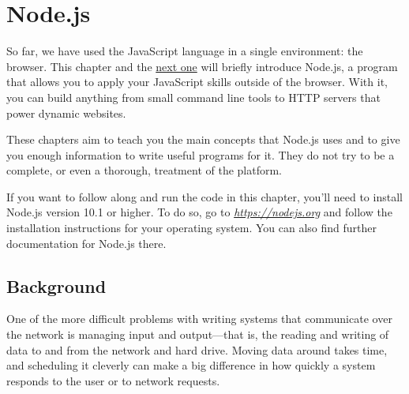 \chapter{Node.js}\label{node}


So far, we have used the JavaScript language in a single environment: the browser. This chapter and the \hyperref[skillsharing]{next one} will briefly introduce Node.js, a program that allows you to apply your JavaScript skills outside of the browser. With it, you can build anything from small command line tools to HTTP servers that power dynamic websites.

These chapters aim to teach you the main concepts that Node.js uses and to give you enough information to write useful programs for it. They do not try to be a complete, or even a thorough, treatment of the platform.

If you want to follow along and run the code in this chapter, you'll need to install Node.js version 10.1 or higher. To do so, go to \href{https://nodejs.org}{\emph{https://nodejs.org}} and follow the installation instructions for your operating system. You can also find further documentation for Node.js there.

\section{Background}

One of the more difficult problems with writing systems that communicate over the network is managing input and output—that is, the reading and writing of data to and from the network and hard
drive. Moving data around takes time, and scheduling it cleverly can make a big difference in how quickly a system responds to the user or to network requests.

